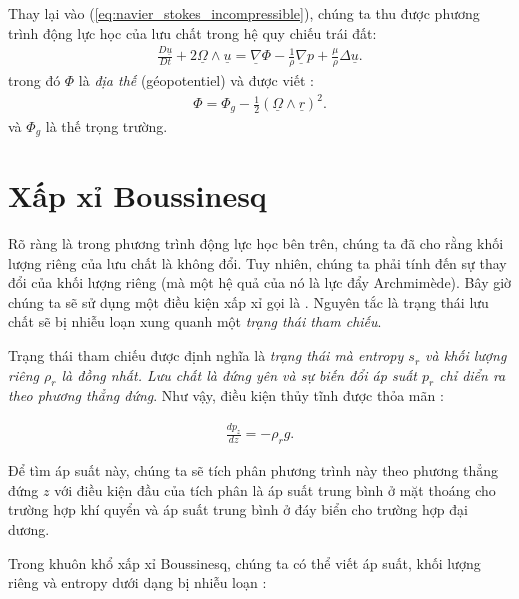 \documentclass[DONG_HOC_KHI_QUYEN.tex]{subfiles}
\begin{document}
Thay lại vào (\ref{eq:navier_stokes_incompressible}), chúng ta thu được phương trình động lực học của lưu chất trong hệ quy chiếu trái đất:
\begin{equation}\label{eq:fund_dynamics}
	\begin{aligned}
		\frac{D\underline{u}}{Dt}+2\underline{\Omega}\wedge\underline{u}=\underline{\nabla}\Phi-\frac{1}{\rho}\underline{\nabla}p+\frac{\mu}{\rho}\Delta\underline{u}.
	\end{aligned}
\end{equation}
trong đó $\Phi$ là \emph{địa thế} (géopotentiel) và được viết :
\begin{equation}
	\begin{aligned}
		\Phi=\Phi_g-\frac{1}{2}\left(\underline{\Omega}\wedge\underline{r}\right)^2.
	\end{aligned}
\end{equation}
và $\Phi_g$ là thế trọng trường.

\section{Xấp xỉ Boussinesq}

Rõ ràng là trong phương trình động lực học bên trên, chúng ta đã cho rằng khối lượng riêng của lưu chất là không đổi. Tuy nhiên, chúng ta phải tính đến sự thay đổi của khối lượng riêng (mà một hệ quả của nó là lực đẩy Archmimède). Bây giờ chúng ta sẽ sử dụng một điều kiện xấp xỉ gọi là . Nguyên tắc là trạng thái lưu chất sẽ bị nhiễu loạn xung quanh một \emph{trạng thái tham chiếu}.

Trạng thái tham chiếu được định nghĩa là \emph{trạng thái mà entropy $s_r$ và khối lượng riêng $\rho_r$ là đồng nhất. Lưu chất là đứng yên và sự biến đổi áp suất $p_r$ chỉ diển ra theo phương thẳng đứng}. Như vậy, điều kiện thủy tĩnh được thỏa mãn :

\begin{equation}
	\begin{aligned}
		\frac{dp_z}{dz}=-\rho_rg.
	\end{aligned}
\end{equation}

Để tìm áp suất này, chúng ta sẽ tích phân phương trình này theo phương thẳng đứng $z$ với điều kiện đầu của tích phân là áp suất trung bình ở mặt thoáng cho trường hợp khí quyển và áp suất trung bình ở đáy biển cho trường hợp đại dương.

Trong khuôn khổ xấp xỉ Boussinesq, chúng ta có thể viết áp suất, khối lượng riêng và entropy dưới dạng bị nhiễu loạn :
\end{document}
